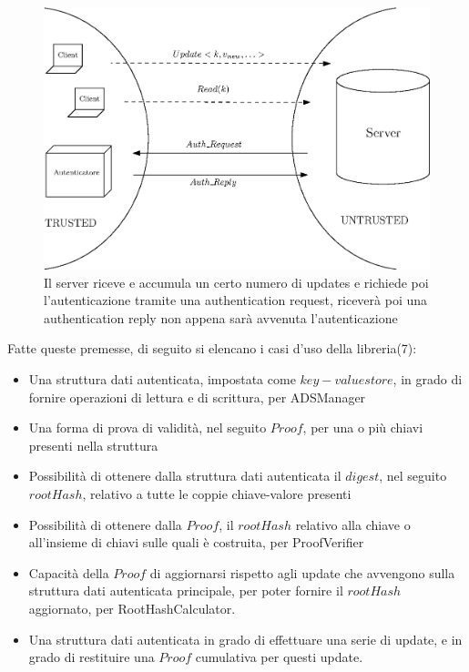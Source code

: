 	\begin{figure}
		\centering
		\includegraphics[scale=0.6]{figure/semicircles.eps}
		\caption{Il server riceve e accumula un certo numero di updates e richiede poi l'autenticazione tramite una authentication request, riceverà poi una authentication reply non appena sarà avvenuta l'autenticazione}\label{fig:7}
	\end{figure}
	
	Fatte queste premesse, di seguito si elencano i casi d'uso della libreria(7):
	
	\begin{itemize}
		\item Una struttura dati autenticata, impostata come $ key-value store $, in grado di fornire operazioni di lettura e di scrittura, per ADSManager
		\item Una forma di prova di validità, nel seguito $ Proof $, per una o più chiavi presenti nella struttura
		\item Possibilità di ottenere dalla struttura dati autenticata il $ digest $, nel seguito $ root Hash $, relativo a tutte le coppie chiave-valore presenti
		\item Possibilità di ottenere dalla $ Proof $, il $ root Hash $ relativo alla chiave o all'insieme di chiavi sulle quali è costruita, per ProofVerifier
		\item Capacità della $ Proof $ di aggiornarsi rispetto agli update che avvengono sulla struttura dati autenticata principale, per poter fornire il $ root Hash $ aggiornato, per RootHashCalculator.
 		\item Una struttura dati autenticata in grado di effettuare una serie di update, e in grado di restituire una $ Proof $ cumulativa per questi update.
	\end{itemize}
	
